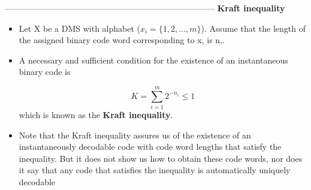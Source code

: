 \documentclass[a4]{beamer}
\begin{document}
---------------------------------------------------------------------------%
\medskip
\noindent \textbf{ Kraft inequality}
\begin{itemize}
\item Let X be a DMS with alphabet ($x _i = \{1, 2, . . . ,m\}$). Assume that the length of the assigned binary
code word corresponding to x, is n,.
\item A necessary and sufficient condition for the existence of an instantaneous binary code is
 
 \[ K = \sum^{m}_{i=1}2^{-n_i} \leq 1 \]
which is known as the \textbf{Kraft inequality}.
\item Note that the Kraft inequality assures us of the existence of an instantaneously decodable code
with code word lengths that satisfy the inequality. But it does not show us how to obtain these code
words, nor does it say that any code that satisfies the inequality is automatically uniquely decodable
\end{itemize}
\end{document}
